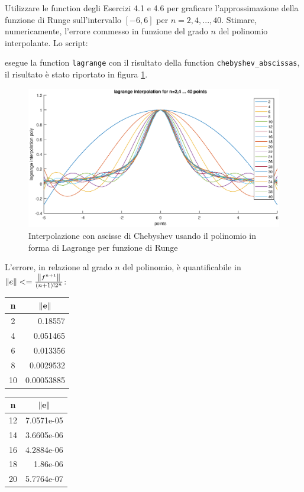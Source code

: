 Utilizzare le function degli Esercizi 4.1 e 4.6 per graficare l'approssimazione della funzione di Runge sull'intervallo $[-6,6]$ per $n= 2,4, ... ,40$. Stimare, numericamente, l'errore commesso in funzione del grado $n$ del polinomio interpolante.
\PP
Lo script:

esegue la function \lstinline{lagrange} con il risultato della function \lstinline{chebyshev_abscissas}, il risultato è stato riportato in figura \ref{4_7_lagrange_interpolation}.\\
\begin{figure}[h!]\label{4_7_lagrange_interpolation}
    \centering
    \includegraphics[scale=0.5]{./capitolo_4/exercise_4_7}
    \caption{Interpolazione con ascisse di Chebyshev usando il polinomio in forma di Lagrange per funzione di Runge}
\end{figure}
\PP
L'errore, in relazione al grado $n$ del polinomio, è quantificabile in $\norm{e} <= \frac{\norm{f^{n+1}}}{(n+1)!2^n}$:
\begin{tabular}{ | c | r }
\textbf{n} & \multicolumn{1}{c}{$\mathbf{\norm{e}}$} \\
\hline
2  &   0.18557  \\
4  &  0.051465  \\
6  &  0.013356  \\
8  & 0.0029532  \\
10 & 0.00053885 \\
\end{tabular}
\begin{tabular}{ | c | r }
\textbf{n} & \multicolumn{1}{c}{$\mathbf{\norm{e}}$} \\
\hline
12 & 7.0571e-05 \\
14 & 3.6605e-06 \\
16 & 4.2884e-06 \\
18 &   1.86e-06 \\
20 & 5.7764e-07 \\
\end{tabular}
